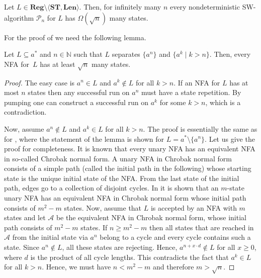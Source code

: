 \documentclass{article}\usepackage[a4paper,margin=20mm]{geometry}
\newcommand{\N}{\mathbb{N}}
\newcommand{\A}{\mathcal{A}}
\renewcommand{\P}{\mathcal{P}}
\newcommand{\Reg}{\mathbf{Reg}}
\newcommand{\Len}{\mathbf{Len}}
\newcommand{\ST}{\mathbf{ST}}
\renewcommand{\geq}{\geqslant}
\begin{document}
\begin{proposition} \label{prop-lower-sqrt}
	Let $L \in \Reg \setminus \langle \ST, \Len \rangle$.
	Then, for infinitely many $n$ every nondeterministic SW-algorithm $\P_n$ for $L$ has $\Omega(\sqrt{n})$ many states.
\end{proposition}

For the proof of  we need the following lemma.

\begin{lemma} \label{lemma-NFA-lower}
Let $L \subseteq a^*$ and $n \in \N$ such that
$L$ separates $\{a^n\}$ and $\{a^k \mid k > n\}$.
Then, every NFA for~$L$ has at least $\sqrt{n}$ many states.
\end{lemma}

\begin{proof}
The easy case is $a^n \in L$ and $a^k \notin L$ for all $k > n$.
If an NFA for $L$ has at most $n$ states then any successful run on $a^n$
must have a state repetition.
By pumping one can construct a successful run on $a^k$ for some $k > n$, which is a contradiction.

Now, assume $a^n \notin L$ and $a^k \in L$ for all $k > n$.
The proof is essentially the same as for \cite[Lemma~6]{JiraskovaM14}, where the statement of the lemma is shown for $L = a^* \setminus \{a^n\}$.
Let us give the proof for completeness. 
It is known that every unary NFA has an equivalent NFA in so-called Chrobak normal form.  A unary NFA in Chrobak normal
form consists of a simple path (called the initial path in the following) whose starting state is the unique initial state of the NFA. 
From  the last state of the initial path, edges go to a collection of 
disjoint cycles. In \cite{Gawrychowski11} it is shown that an $m$-state unary NFA has an equivalent NFA in Chrobak normal form whose
initial path consists of $m^2 - m$ states. Now, assume that $L$ is accepted by an NFA with $m$ states and let $\A$ 
be the equivalent NFA in Chrobak normal form, whose initial path consists of $m^2-m$ states. If $n \geq m^2-m$ then all states
that are reached in $\A$ from the initial state via $a^n$ belong to a cycle and every cycle contains such a state. Since
$a^n \notin L$, all these states are rejecting. Hence, $a^{n+ x \cdot d} \notin L$ for all $x \geq 0$, where $d$ is the product
of all cycle lengths. This contradicts the fact that $a^k \in L$ for all $k > n$. Hence, we must have $n < m^2-m$ and therefore
$m > \sqrt{n}$.
\end{proof}
\end{document}
